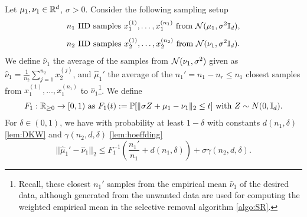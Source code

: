 \begin{lemma}
\label{lem:bias_selection}
    Let $\mu_1, \nu_1 \in \mathbb{R}^d$, $\sigma>0$.
    Consider the following sampling setup
    \[
    n_1
    \text{ IID samples }
    x_1^{(1)}, \ldots, x_1^{(n_1)} 
    \text{ from }
    \mathcal{N}(\mu_1, \sigma^2\mathbb{I}_d),
    \]
    \[
    n_2 \text{ IID  samples }
    x_2^{(1)}, \ldots, x_2^{(n_2)}
    \text{ from }
    \mathcal{N}(\nu_1, \sigma^2\mathbb{I}_d).
    \]
    We define $\hat{\nu}_1$ the average of the samples from $\mathcal{N}(\nu_1, \sigma^2)$ given as $\hat{\nu}_1= \frac{1}{n_2} \sum_{j=1}^{n_2}x_2^{(j)}$, and  $\hat{\mu}_1'$ the average of the $n_1'=n_1 - n_r \leq n_1$ closest samples from $x_1^{(1)}, \ldots, x_1^{(n_1)}$ to $\hat{\nu}_1$\footnote{Recall, these closest $n_1'$ samples from the empirical mean $\hat{\nu}_1$ of the desired data, although generated from the unwanted data are used for computing the weighted empirical mean in the selective removal algorithm \ref{algo:SR}.}. We define
    \begin{equation}
    F_1: \mathbb{R}_{\geq 0} \to  [0,1) \text{ as }
    F_1(t):= \mathbb{P}[\|\sigma Z + \mu_1- \nu_1\|_2 \leq t] \text{ with } Z \sim N(0, \mathbb{I}_d). 
    \end{equation}
For $\delta \in (0,1)$, we have with probability at least $1-\delta$ with constants $d(n_1, \delta)$ \ref{lem:DKW} and $\gamma(n_2, d, \delta)$ \ref{lem:hoeffding}
    \begin{equation}
       ||\hat{\mu}_1' - \hat{\nu}_1||_2 \leq F_1^{-1}{\left(\frac{n_1'}{n_1} + d(n_1, \delta)\right)} + \sigma \gamma(n_2,d, \delta).
    \end{equation}
\end{lemma}
